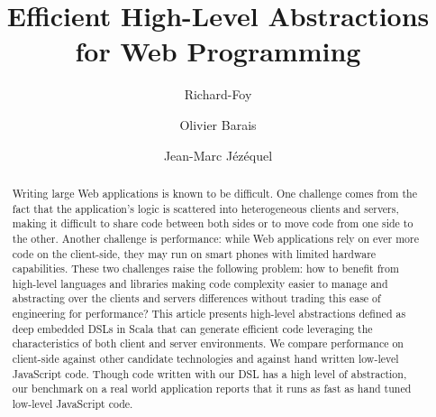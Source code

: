 \documentclass{llncs}
\begin{document}


\title{Efficient High-Level Abstractions for Web Programming}

\author{Richard-Foy\and Olivier Barais\and Jean-Marc Jézéquel}
          

\maketitle

\begin{abstract}


Writing large Web applications is known to be difficult. One challenge comes from the fact that the
application's logic is scattered into heterogeneous clients and servers, making it difficult to
share code between both sides or to move code from one side to the other. Another challenge is
performance: while Web applications rely on ever more code on the client-side, they may run on smart
phones with limited hardware capabilities. These two challenges raise the following problem: how to
benefit from high-level languages and libraries making code complexity easier to manage and
abstracting over the clients and servers differences without trading this ease of engineering for
performance? This article presents high-level abstractions defined as deep embedded DSLs in Scala that can generate efficient code leveraging the characteristics of both client and server environments. We compare performance on client-side against other candidate technologies and against hand written low-level JavaScript code. Though code written with our DSL has a high level of abstraction, our
benchmark on a real world application reports that it runs as fast as hand tuned low-level
JavaScript code.
\end{abstract}


\end{document}
